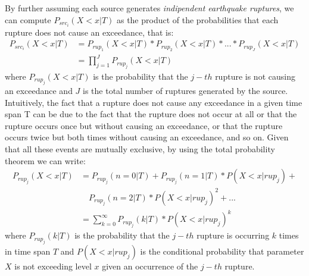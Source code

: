 By further assuming each source generates \textit{indipendent
earthquake ruptures}, we can compute $P_{src_{i}}(X < x | T)$ as the product of the probabilities that each rupture
does not cause an exceedance, that is:
\begin{align}
\label{eq:prup_noexceed_src}
P_{src_{i}}(X < x | T) & = P_{rup_{1}}(X < x | T) * P_{rup_{2}}(X < x | T) * ... * P_{rup_{J}}(X < x | T) \nonumber \\
			        & = \prod_{j=1}^{J} P_{rup_{j}}(X < x | T)
\end{align}
where $P_{rup_{j}}(X < x | T)$ is the probability that the $j-th$ rupture is not causing an exceedance and $J$ is
the total number of ruptures generated by the source. Intuitively, the fact that a rupture does not cause any
exceedance in a given time span T can be due to the fact that the rupture does not occur at all or that the
rupture occurs once but without causing an exceedance, or that the rupture occurs twice but both times
without causing an exceedance, and so on. Given that all these events are mutually exclusive, by using the
total probability theorem we can write:
\begin{align}
\label{eq:prup_noexceed_rup}
P_{rup_{j}}(X < x | T) & = P_{rup_{j}}(n = 0 | T) + P_{rup_{j}}(n = 1 | T) * P(X < x | rup_{j}) + \nonumber \\
                                &\quad	P_{rup_{j}}(n = 2 | T) * P(X < x | rup_{j})^{2}  + ... \nonumber \\
				 & = \sum_{k=0}^{\infty} P_{rup_{j}}(k | T) * P(X < x | rup_{j}) ^ {k} 
\end{align}
where $P_{rup_{j}}(k | T)$ is the probability that the $j-th$ rupture is occurring $k$ times in time span $T$ and
$P(X < x | rup_{j})$ is the conditional probability that parameter $X$ is not exceeding level $x$ given an
occurrence of the $j-th$ rupture.

